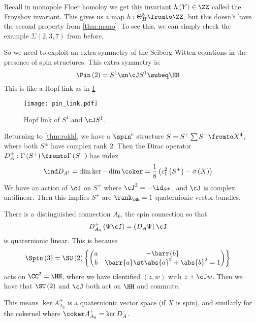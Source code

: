 \documentclass{amsart}
\begin{document}
Recall in monopole Floer homoloy 
we get this invariant $h\left( Y \right)\in \ZZ$
called the Froyshov invariant.
This gives us a map 
$h:\Theta_H^3 \fromto \ZZ$,
but this doesn't have the second property from \cref{thm:mano}.
To see this, we can simply check the example
$\Sigma\left( 2 , 3 , 7 \right)$ from before.

So we need to exploit an extra symmetry of the Seiberg-Witten equations
in the presence of spin structures.
This extra symmetry is:
\begin{equation}
\Pin\left( 2 \right)= S^1 \un \cJ S^1 \subeq \HH
\end{equation}
This is like a Hopf link as in \cref{fig:pin_link}
\begin{figure}
\texttt{[image: pin\_link.pdf]}
\caption{Hopf link of $S^1$ and $\cJ S^1$.}
\label{fig:pin_link}
\end{figure}

Returning to \cref{thm:rokh},
we have a $\spin^c$ structure
$S = S^+ \sum S^-\fromto X^4$, where both $S^{\pm}$
have complex rank $2$.
Then the Dirac operator
$D_A^+:\Gamma\left( S^+  \right)\fromto \Gamma\left( S^- \right)$
has index
\begin{equation}
\ind D_{A^t}  = \dim \ker - \dim \coker = 
\frac{1}{8}\left( c_1^2\left( S^+ \right) - \sigma\left( X \right) \right)
\end{equation}
We have an action of $\cJ$ on $S^{\pm}$ where
$\cJ^2 = -\id_{S^{\pm}}$, and $\cJ$ is complex antilinear. 
Then this implies $S^{\pm}$ are $\rank_{\HH} = 1$
quaternionic vector bundles.

There is a distinguished connection
$A_0$, the spin connection so that
\begin{equation}
D_{A_0}^+ \left( \Psi \cJ \right) = 
\left( D_A \Psi \right) \cJ
\end{equation}
is quaternionic linear. This is because 
\begin{equation}
\Spin\left( 3 \right) = \SU\left( 2 \right)
\left\{ 
\begin{pmatrix}
a & - \barr{b} \\ b & \barr{a} \st 
\abs{a}^2 +\abs{b}^2 = 1
\end{pmatrix}
\right\}
\end{equation}
acts on $\CC^2 = \HH$, where we have identified
$\left( z,w \right)$ with $z + \cJ w$.
Then we have that $\SU\left( 2 \right)$ and $\cJ$ both act on $\HH$ and commute.

This means
$\ker A_{A_0}^+$ is a quaternionic vector space
(if $X$ is spin), and similarly for the cokernel where
$\coker A_{A_0}^+ = \ker D_A^-$.
\end{document}
